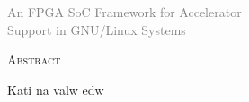 \cleardoublepage
\rm
\begin{center}
	\textcolor{gray} {\large
		An FPGA SoC Framework for Accelerator\\
		Support in GNU/Linux Systems\\
	}

	\vspace{80pt}
	\textsc{\large Abstract}\\
	\vspace{50pt}
\end{center}
Kati na valw edw
\vspace*{\fill}
